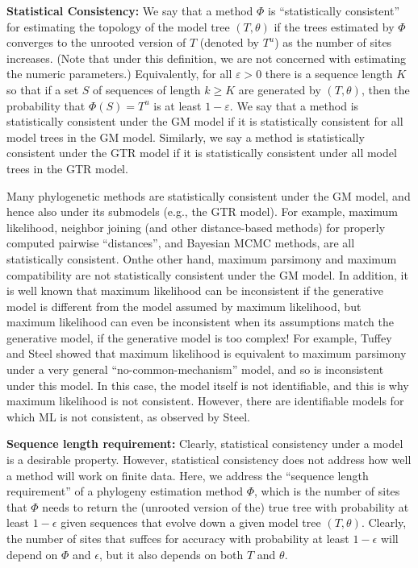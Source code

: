 \textbf{Statistical Consistency:} We say that a method $\Phi$ is ``statistically consistent'' 
for estimating the topology of the model tree $(T,\theta )$ if the trees estimated 
by $\Phi$ converges to the unrooted version of $T$ (denoted by $T^u$) as the number 
of sites increases. (Note that under this definition, we are not concerned 
with estimating the numeric parameters.) Equivalently, for all $\varepsilon > 0$ there 
is a sequence length $K$ so that if a set $S$ of sequences of length $k \geq K$ are 
generated by $(T,\theta)$, then the probability that $\Phi(S) = T^u$ is at least $1-\varepsilon$. 
We say that a method is statistically consistent under the GM model if 
it is statistically consistent for all model trees in the GM model. 
Similarly, we say a method is statistically consistent under the GTR 
model if it is statistically consistent under all model trees in the GTR model. 

Many phylogenetic methods are statistically consistent under the GM model, 
and hence also under its submodels (e.g., the GTR model). For example, 
maximum likelihood, neighbor joining (and other distance-based methods) 
for properly computed pairwise ``distances'', and Bayesian MCMC methods, 
are all statistically consistent. Onthe other hand, maximum parsimony and 
maximum compatibility are not statistically consistent under the GM 
model. In addition, it is well known that maximum likelihood can be 
inconsistent if the generative model is different from the model 
assumed by maximum likelihood, but maximum likelihood can even be 
inconsistent when its assumptions match the generative model, 
if the generative model is too complex! For example, 
Tuffey and Steel showed that maximum likelihood is equivalent 
to maximum parsimony under a very general ``no-common-mechanism'' model, 
and so is inconsistent under this model. In this case, the model 
itself is not identifiable, and this is why maximum likelihood 
is not consistent. However, there are identifiable models for 
which ML is not consistent, as observed by Steel.

\textbf{Sequence length requirement:} Clearly, statistical consistency 
under a model is a desirable property. However, statistical consistency 
does not address how well a method will work on finite data. 
Here, we address the ``sequence length requirement'' of a phylogeny 
estimation method $\Phi$, which is the number of sites that $\Phi$ needs 
to return the (unrooted version of the) true tree with 
probability at least $1 - \epsilon$ given sequences that evolve 
down a given model tree $(T,\theta)$. Clearly, the number of 
sites that suffces for accuracy with probability at 
least $1 - \epsilon$ will depend on $\Phi$ and $\epsilon$, but it also 
depends on both $T$ and $\theta$. 

